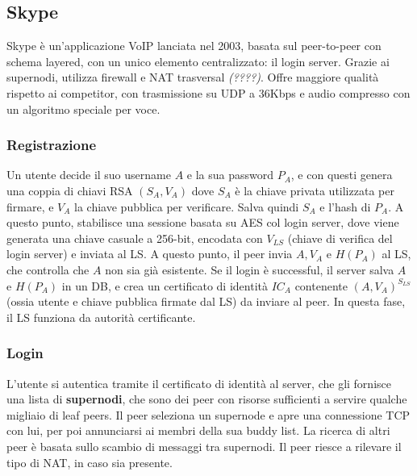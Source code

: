 \documentclass[11pt]{article}
\begin{document}
\subsection{Skype} Skype è un'applicazione VoIP lanciata nel 2003, basata sul peer-to-peer con schema layered, con un unico elemento centralizzato: il login server. Grazie ai supernodi, utilizza firewall e NAT trasversal \textit{(????)}. Offre maggiore qualità rispetto ai competitor, con trasmissione su UDP a 36Kbps e audio compresso con un algoritmo speciale per voce. 
\subsubsection{Registrazione}
Un utente decide il suo username $A$ e la sua password $P_A$, e con questi genera una coppia di chiavi RSA $(S_A, V_A)$ dove $S_A$ è la chiave privata utilizzata per firmare, e $V_A$ la chiave pubblica per verificare. Salva quindi $S_A$ e l'hash di $P_A$. A questo punto, stabilisce una sessione basata su AES col login server, dove viene generata una chiave casuale a 256-bit, encodata con $V_{LS}$ (chiave di verifica del login server) e inviata al LS.
A questo punto, il peer invia $A, V_A$ e $H(P_A)$ al LS, che controlla che $A$ non sia già esistente. Se il login è successful, il server salva $A$ e $H(P_A)$ in un DB, e crea un certificato di identità $IC_A$ contenente $(A,V_A)^{S_{LS}}$ (ossia utente e chiave pubblica firmate dal LS) da inviare al peer. In questa fase, il LS funziona da autorità certificante. 
\subsubsection{Login} L'utente si autentica tramite il certificato di identità al server, che gli fornisce una lista di \textbf{supernodi}, che sono dei peer con risorse sufficienti a servire qualche migliaio di leaf peers. Il peer seleziona un supernode e apre una connessione TCP con lui, per poi annunciarsi ai membri della sua buddy list. La ricerca di altri peer è basata sullo scambio di messaggi tra supernodi. Il peer riesce a rilevare il tipo di NAT, in caso sia presente. 
\end{document}
